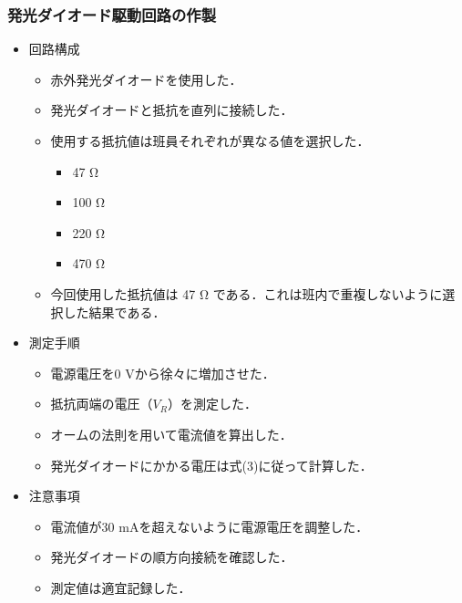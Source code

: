 \documentclass{ltjsarticle}
\begin{document}
\subsubsection{発光ダイオード駆動回路の作製}
\begin{itemize}
  \item 回路構成
  \begin{itemize}
    \item 赤外発光ダイオードを使用した．
    \item 発光ダイオードと抵抗を直列に接続した．
    \item 使用する抵抗値は班員それぞれが異なる値を選択した．
    \begin{itemize}
      \item 47 Ω
      \item 100 Ω
      \item 220 Ω
      \item 470 Ω
    \end{itemize}
    \item 今回使用した抵抗値は 47 Ω である．これは班内で重複しないように選択した結果である．
  \end{itemize}

  \item 測定手順
  \begin{itemize}
    \item 電源電圧を0 Vから徐々に増加させた．
    \item 抵抗両端の電圧（$V_R$）を測定した．
    \item オームの法則を用いて電流値を算出した．
    \item 発光ダイオードにかかる電圧は式(3)に従って計算した．
  \end{itemize}
  \item 注意事項
  \begin{itemize}
    \item 電流値が30 mAを超えないように電源電圧を調整した．
    \item 発光ダイオードの順方向接続を確認した．
    \item 測定値は適宜記録した．
  \end{itemize}
\end{itemize}
\end{document}
